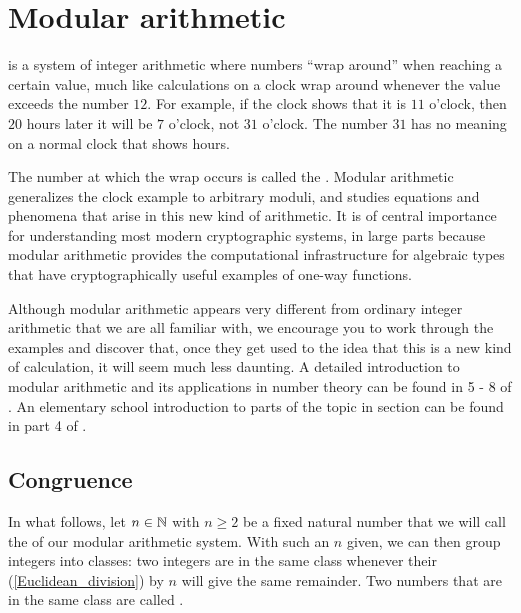 \section{Modular arithmetic}
\label{modular_arithmetic}
 is a system of integer arithmetic where numbers ``wrap around'' when reaching a certain value, much like calculations on a clock wrap around whenever the value exceeds the number $12$. For example, if the clock shows that it is $11$ o'clock, then $20$ hours later it will be $7$ o'clock, not $31$ o'clock. The number $31$ has no meaning on a normal clock that shows hours.

The number at which the wrap occurs is called the . Modular arithmetic generalizes the clock example to arbitrary moduli, and studies equations and phenomena that arise in this new kind of arithmetic. It is of central importance for understanding most modern cryptographic systems, in large parts because modular arithmetic provides the computational infrastructure for algebraic types that have cryptographically useful examples of one-way functions.\

Although modular arithmetic appears very different from ordinary integer arithmetic that we are all familiar with, we encourage you to work through the examples and discover that, once they get used to the idea that this is a new kind of calculation, it will seem much less daunting. A detailed introduction to modular arithmetic and its applications in number theory can be found in \chaptname{} 5 - 8 of \cite{hardy-2008}. An elementary school introduction to parts of the topic in section can be found in part 4 of \cite{wu-1}.

\subsection{Congruence}
In what follows, let $n\in\mathbb{N}$ with $n\geq 2$ be a fixed natural number that we will call the  of our modular arithmetic system. With such an $n$ given, we can then group integers into classes: two integers are in the same class whenever their  (\ref{Euclidean_division}) by $n$ will give the same remainder. Two numbers that are in the same class are called .

